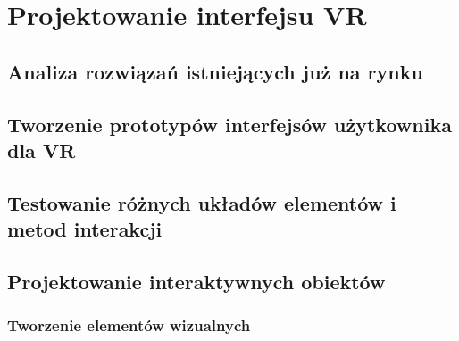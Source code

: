 \chapter{Projektowanie interfejsu VR}
\section{Analiza rozwiązań istniejących już na rynku}
\section{Tworzenie prototypów interfejsów użytkownika dla VR}
\section{Testowanie różnych układów elementów i metod interakcji}
\section{Projektowanie interaktywnych obiektów}
\subsection{Tworzenie elementów wizualnych}



